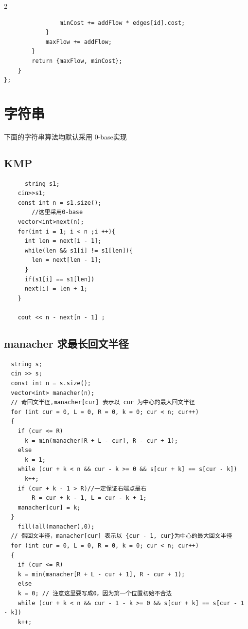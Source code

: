 \documentclass[10pt]{article}
\begin{document}
\begin{multicols*}{2}
\begin{verbatim}
                minCost += addFlow * edges[id].cost;
            }
            maxFlow += addFlow;
        }
        return {maxFlow, minCost};
    }
};
\end{verbatim}




\section{字符串}


下面的字符串算法均默认采用 0-base实现 \par

\subsection{KMP}


\begin{verbatim}
 	  string s1;
    cin>>s1;
    const int n = s1.size();
		//这里采用0-base
    vector<int>next(n);
    for(int i = 1; i < n ;i ++){
      int len = next[i - 1];
      while(len && s1[i] != s1[len]){
        len = next[len - 1];
      }
      if(s1[i] == s1[len])
      next[i] = len + 1;
    }

    cout << n - next[n - 1] ; 
\end{verbatim}




\subsection{manacher 求最长回文半径}


\begin{verbatim}
  string s;
  cin >> s;
  const int n = s.size();
  vector<int> manacher(n);
  // 奇回文半径,manacher[cur] 表示以 cur 为中心的最大回文半径
  for (int cur = 0, L = 0, R = 0, k = 0; cur < n; cur++)
  {
    if (cur <= R)
      k = min(manacher[R + L - cur], R - cur + 1);
    else
      k = 1;
    while (cur + k < n && cur - k >= 0 && s[cur + k] == s[cur - k])
      k++;
    if (cur + k - 1 > R)//一定保证右端点最右
    	R = cur + k - 1, L = cur - k + 1;
    manacher[cur] = k;
  }
	fill(all(manacher),0);
  // 偶回文半径，manacher[cur] 表示以 {cur - 1, cur}为中心的最大回文半径
  for (int cur = 0, L = 0, R = 0, k = 0; cur < n; cur++)
  {
    if (cur <= R)
    k = min(manacher[R + L - cur + 1], R - cur + 1);
    else
    k = 0; // 注意这里要写成0，因为第一个位置初始不合法
    while (cur + k < n && cur - 1 - k >= 0 && s[cur + k] == s[cur - 1 - k])
    k++;
    

\end{verbatim}
\end{multicols*}
\end{document}
